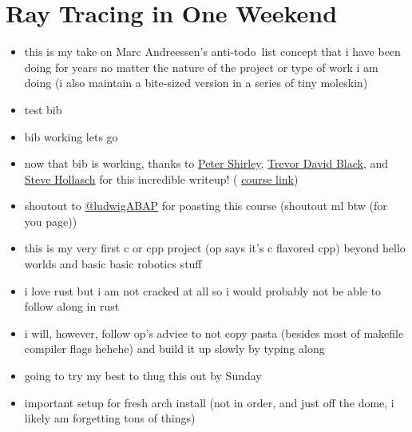 \clearpage
\section{Ray Tracing in One Weekend}

\begin{itemize}
    \item this is my take on Marc Andreessen's anti-todo\footnotemark\ list
        concept that i have been doing for years no matter the nature of the 
        project or type of work i am doing (i also maintain a bite-sized 
        version in a series of tiny moleskin)
    \item test bib \cite{Shirley2024RTW1}
    \item bib working lets go
    \item now that bib is working, thanks to 
        \textcolor{blue}{\href{https://github.com/petershirley}{Peter Shirley}},
        \textcolor{blue}{\href{https://github.com/trevordblack}{Trevor David Black}}, and
        \textcolor{blue}{\href{https://github.com/hollasch}{Steve Hollasch}}
        for this incredible writeup! \cite{Shirley2024RTW1} (
        \textcolor{DarkGreen}{\href{https://raytracing.github.io/books/RayTracingInOneWeekend.html}{course
        link}})
    \item shoutout to 
        \textcolor{blue}{\href{https://x.com/ludwigABAP}{@ludwigABAP}}
        for poasting this course (shoutout ml btw (for you page))
    \item this is my very first c or cpp project (op says it's c flavored cpp) 
        beyond hello worlds and basic basic robotics stuff
    \item i love rust but i am not cracked at all so i would probably not be
        able to follow along in rust
    \item i will, however, follow op's advice to not copy pasta (besides most of 
        makefile compiler flags hehehe) and build it up slowly by typing along
    \item going to try my best to thug this out by Sunday
    \item important setup for fresh arch install (not in order, and just off the
        dome, i likely am forgetting tons of things)

\end{itemize}
